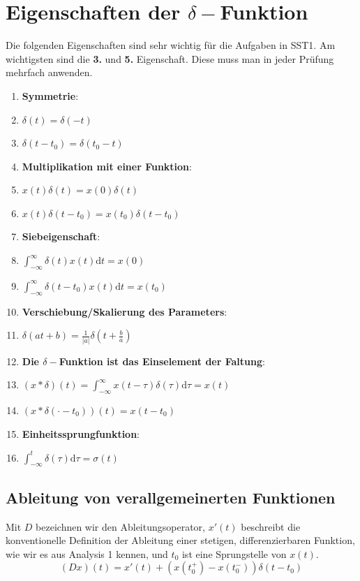 \documentclass[11pt]{article}
\begin{document}
\vfill \null
\pagebreak

\section*{Eigenschaften der $\delta-$Funktion}
\vspace*{-0.5cm}
Die folgenden Eigenschaften sind sehr wichtig für die Aufgaben in SST1. Am wichtigsten sind die \textbf{3.} und \textbf{5.} Eigenschaft. Diese muss man in jeder Prüfung mehrfach anwenden.
\vspace*{-0.5cm}
\begin{enumerate}
    \item \textbf{Symmetrie}: 
    \item[] $\delta(t) = \delta(-t)$
    \item[] $\delta(t-t_0) = \delta(t_0 - t)$
    \item \textbf{Multiplikation mit einer Funktion}: \item[] $x(t)\delta(t) = x(0)\delta(t)$
    \item[] $x(t)\delta(t-t_0)=x(t_0)\delta(t-t_0)$
    \item \textbf{Siebeigenschaft}: 
    \item[] $\displaystyle\int_{-\infty}^{\infty}\delta(t)x(t)\text{d}t = x(0)$
    \item[] $\displaystyle\int_{-\infty}^{\infty}\delta(t-t_0)x(t)\text{d}t = x(t_0)$
    \item \textbf{Verschiebung/Skalierung des Parameters}:
    \item[] $\delta(at + b) = \displaystyle\frac{1}{|a|}\delta\left(t + \displaystyle\frac{b}{a} \right)$
    \item \textbf{Die $\delta-$Funktion ist das Einselement der Faltung}:
    \item[] $(x \ast \delta)(t) = \displaystyle\int_{-\infty}^\infty x(t-\tau)\delta(\tau)\text{d}\tau = x(t)$
    \item[] $(x \ast \delta(\cdot - t_0))(t) = x(t - t_0)$
    \item \textbf{Einheitssprungfunktion}:
    \item[] $\displaystyle\int_{-\infty}^t \delta(\tau) \text{d}\tau = \sigma(t)$
\end{enumerate}

\vspace*{-0.5cm}
\subsection*{Ableitung von verallgemeinerten Funktionen}
\vspace*{-0.5cm}
Mit $D$ bezeichnen wir den Ableitungsoperator, $x'(t)$ beschreibt die konventionelle Definition der Ableitung einer stetigen, differenzierbaren Funktion, wie wir es aus Analysis 1 kennen, und $t_0$ ist eine Sprungstelle von $x(t)$.
$$(Dx)(t) = x'(t) + (x(t_0^+)- x(t_0^-))\delta(t-t_0)$$
\end{document}
